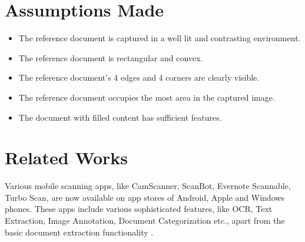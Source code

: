 \section{Assumptions Made}
\label{Assumptions}
\begin{itemize}
  \item The reference document is captured in a well lit and contrasting environment.
  \item The reference document is rectangular and convex.
  \item The reference document's 4 edges and 4 corners are clearly visible.
  \item The reference document occupies the most area in the captured image.
  \item The document with filled content has sufficient features.
\end{itemize}

\section{Related Works}

Various mobile scanning apps, like CamScanner, ScanBot, Evernote Scannable, Turbo Scan, are now available on app stores of Android, Apple and Windows phones. These apps include various sophisticated features, like OCR, Text Extraction, Image Annotation, Document Categorization etc., apart from the basic document extraction functionality .



